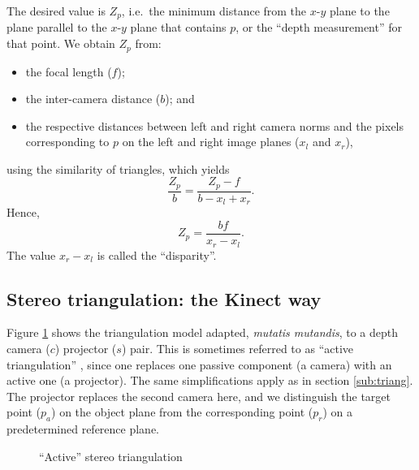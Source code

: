 The desired value is $Z_{p}$, i.e.\ the minimum distance from the $x$-$y$ plane to the plane parallel to the $x$-$y$ plane that contains $p$, or the ``depth measurement'' for that point. We obtain $Z_{p}$ from: 
\begin{itemize}

    \item the focal length ($f$);

    \item the inter-camera distance ($b$); and 

    \item the respective distances between left and right camera norms and the
    pixels corresponding to $p$ on the left and right image planes ($x_{l}$ and
    $x_{r}$),

\end{itemize}
using the similarity of triangles, which yields
\[
    \frac{Z_p}{b} = \frac{Z_p - f}{b - x_l + x_r}.
\]
Hence,
\[
Z_p = \frac {bf}{x_r - x_l}.
\]
The value $x_r - x_l$ is called the ``disparity''.

\subsection{Stereo triangulation: the Kinect way}

Figure \ref{fig:atriang} shows the triangulation model adapted, \emph{mutatis
mutandis}, to a depth camera ($c$) projector ($s$) pair. This is sometimes
referred to as ``active triangulation'' \cite{alexander1987}, since one replaces
one passive component (a camera) with an active one (a projector). The same
simplifications apply as in section \ref{sub:triang}. The projector replaces the
second camera here, and we distinguish the target point ($p_a$) on the object
plane from the corresponding point ($p_r$) on a predetermined reference plane.

\begin{figure}[ht]
    \begin{center}
        
        \caption{``Active'' stereo triangulation}
        \label{fig:atriang}
    \end{center}
\end{figure}

